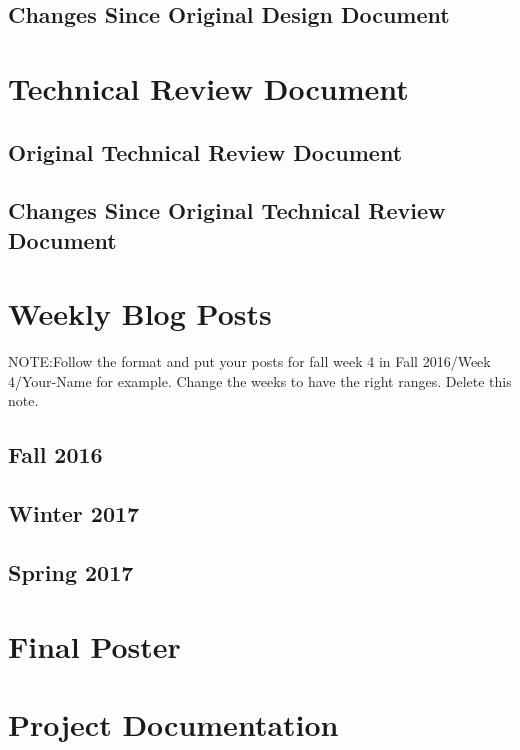 \documentclass[letterpaper,10pt]{article}
\begin{document}
\subsection{Changes Since Original Design Document}

\section{Technical Review Document}
\subsection{Original Technical Review Document}

\subsection{Changes Since Original Technical Review Document}

\section{Weekly Blog Posts}
NOTE:Follow the format and put your posts for fall week 4 in Fall 2016/Week 4/Your-Name for example. Change the weeks to have the right ranges. Delete this note.

\subsection{Fall 2016}


\subsection{Winter 2017}


\subsection{Spring 2017}


\clearpage
\section{Final Poster}
\clearpage 

\section{Project Documentation}

\end{document}
